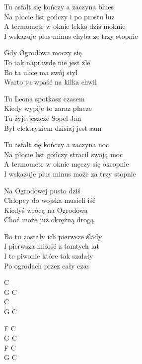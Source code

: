 \begin{text}
    Tu asfalt się kończy a zaczyna blues\\
    Na płocie list gończy i po prostu luz\\
    A termometr w oknie lekko dziś moknie\\
    I wskazuje plus minus chyba ze trzy stopnie

    Gdy Ogrodowa moczy się\\
    To tak naprawdę nie jest źle\\
    Bo ta ulice ma swój styl\\
    Warto tu wpaść na kilka chwil

    Tu Leona spotkasz czasem\\
    Kiedy wypije to zaraz płacze\\
    Tu żyje jeszcze Sopel Jan\\
    Był elektrykiem dzisiaj jest sam

    Tu asfalt się kończy a zaczyna noc\\
    Na płocie list gończy stracił swoją moc\\
    A termometr w oknie męczy się okropnie\\
    I wskazuje plus minus może za trzy stopnie

    Na Ogrodowej pusto dziś\\
    Chłopcy do wojska musieli iść\\
    Kiedyś wrócą na Ogrodową\\
    Choć może już okrężną drogą

    Bo tu zostały ich pierwsze ślady\\
    I pierwsza miłość z tamtych lat\\
    I te piwonie które tak szalały\\
    Po ogrodach przez cały czas
\end{text}
\begin{chord}
    C\\
    G C\\
    C\\
    G C

    F C\\
    G C\\
    F C\\
    G C
\end{chord}